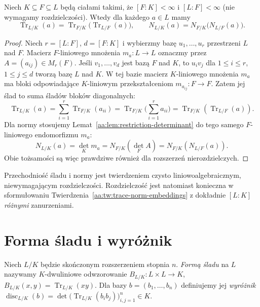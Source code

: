 \begin{twierdzenie}
\label{aa:tw:trace-norm-tower}
\label{aa:thm:trace-norm-tower}
Niech $K\subseteq F\subseteq L$ będą ciałami takimi, że
$[F:K]<\infty$ i $[L:F]<\infty$
(nie wymagamy rozdzielczości).
Wtedy dla każdego $a\in L$ mamy
\[
\operatorname{Tr}_{L/K}(a)=\operatorname{Tr}_{F/K}\bigl(
\operatorname{Tr}_{L/F}(a)\bigr),\qquad
N_{L/K}(a)=N_{F/K}\bigl(N_{L/F}(a)\bigr).
\]
\end{twierdzenie}
\begin{proof}
Niech $r=[L:F]$, $d=[F:K]$ i wybierzmy bazę
$u_1,\ldots,u_r$ przestrzeni $L$ nad $F$.
Macierz $F$-liniowego mnożenia $m_a:L\to L$
oznaczmy przez $A=(a_{ij})\in M_r(F)$.
Jeśli $v_1,\ldots,v_d$ jest bazą $F$ nad $K$,
to $u_iv_j$ dla $1\le i\le r$, $1\le j\le d$
tworzą bazę $L$ nad $K$. W tej bazie macierz
$K$-liniowego mnożenia $m_a$ ma bloki
odpowiadające $K$-liniowym przekształceniom
$m_{a_{ij}}:F\to F$.
Zatem jej ślad to suma śladów bloków diagonalnych:
\[
\operatorname{Tr}_{L/K}(a)
=\sum_{i=1}^r\operatorname{Tr}_{F/K}(a_{ii})
=\operatorname{Tr}_{F/K}\bigl(\sum_{i=1}^r a_{ii}\bigr)
=\operatorname{Tr}_{F/K}(\operatorname{Tr}_{L/F}(a)).
\]
Dla normy stosujemy
Lemat~\ref{aa:lem:restriction-determinant}
do tego samego $F$-liniowego endomorfizmu $m_a$:
\[
N_{L/K}(a)=\det_K m_a
=N_{F/K}(\det_F A)=N_{F/K}(N_{L/F}(a)).
\]
Obie tożsamości są więc prawdziwe również dla
rozszerzeń nierozdzielczych.
\end{proof}

\begin{uwaga}
\label{aa:uw:trace-norm-inseparable}
Przechodniość śladu i normy jest twierdzeniem
czysto liniowoalgebraicznym, niewymagającym rozdzielczości.
Rozdzielczość jest natomiast konieczna w sformułowaniu
Twierdzenia~\ref{aa:tw:trace-norm-embeddings}
z dokładnie $[L:K]$ \emph{różnymi} zanurzeniami.
\end{uwaga}

\section{Forma śladu i wyróżnik}
\begin{definicja}
\label{aa:def:trace-discriminant}
Niech $L/K$ będzie skończonym rozszerzeniem stopnia $n$.
\emph{Formą śladu} na $L$ nazywamy $K$-dwuliniowe
odwzorowanie $B_{L/K}:L\times L\to K$,
$B_{L/K}(x,y)=\operatorname{Tr}_{L/K}(xy)$.
Dla bazy $b=(b_1,\ldots,b_n)$ definiujemy jej
\emph{wyróżnik}
$\operatorname{disc}_{L/K}(b)=\det\bigl(
\operatorname{Tr}_{L/K}(b_i b_j)\bigr)_{i,j=1}^n\in K$.
\end{definicja}

